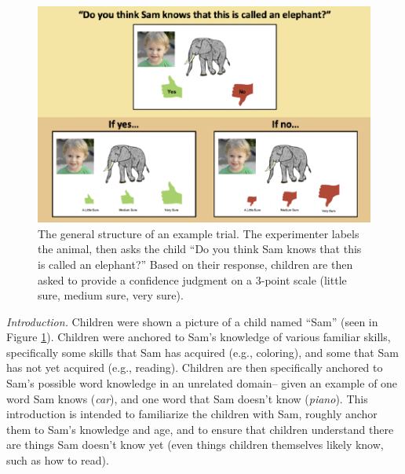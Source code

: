 \documentclass[10pt, letterpaper]{article}
\newenvironment{CodeChunk}{}{}
\begin{document}
\begin{CodeChunk}
\begin{figure}[tb]

{\centering \includegraphics{figs/task-method-1} 

}

\caption[The general structure of an example trial]{The general structure of an example trial. The experimenter labels the animal, then asks the child “Do you think Sam knows that this is called an elephant?” Based on their response, children are then asked to provide a confidence judgment on a 3-point scale (little sure, medium sure, very sure).}\label{fig:task-method}
\end{figure}
\end{CodeChunk}

\emph{Introduction.} Children were shown a picture of a child named
``Sam'' (seen in Figure \ref{fig:task-method}). Children were anchored
to Sam's knowledge of various familiar skills, specifically some skills
that Sam has acquired (e.g., coloring), and some that Sam has not yet
acquired (e.g., reading). Children are then specifically anchored to
Sam's possible word knowledge in an unrelated domain-- given an example
of one word Sam knows (\emph{car}), and one word that Sam doesn't know
(\emph{piano}). This introduction is intended to familiarize the
children with Sam, roughly anchor them to Sam's knowledge and age, and
to ensure that children understand there are things Sam doesn't know yet
(even things children themselves likely know, such as how to read).
\end{document}
